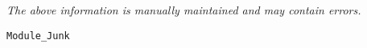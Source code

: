 \label{pkg:module\_junk}

{\tiny \it The above information is manually maintained and may contain errors.}
\begin{verbatim}
Module_Junk
\end{verbatim}
